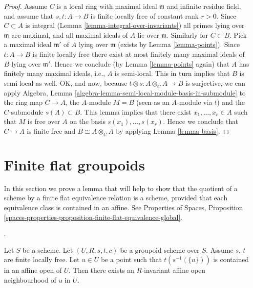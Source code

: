 \begin{proof}
\medskip\noindent
Assume $C$ is a local ring with maximal ideal $\mathfrak m$ and
infinite residue field, and assume that $s, t : A \to B$ is
finite locally free of constant rank $r > 0$.
Since $C \subset A$ is integral (Lemma \ref{lemma-integral-over-invariants})
all primes lying over $\mathfrak m$ are maximal, and all maximal
ideals of $A$ lie over $\mathfrak m$. Similarly for $C \subset B$.
Pick a maximal ideal $\mathfrak m'$
of $A$ lying over $\mathfrak m$ (exists by Lemma \ref{lemma-points}).
Since $t : A \to B$ is finite locally free there exist at most finitely
many maximal ideals of $B$ lying over $\mathfrak m'$. Hence we conclude
(by Lemma \ref{lemma-points} again)
that $A$ has finitely many maximal ideals, i.e.,
$A$ is semi-local. This in turn implies that $B$ is semi-local as
well. OK, and now, because $t \otimes s : A \otimes_C A \to B$ is surjective,
we can apply
Algebra, Lemma \ref{algebra-lemma-semi-local-module-basis-in-submodule}
to the ring map $C \to A$, the $A$-module $M = B$ (seen as an $A$-module
via $t$) and the $C$-submodule $s(A) \subset B$. This lemma implies that there
exist $x_1, \ldots, x_r \in A$ such that $M$ is free over $A$
on the basis $s(x_1), \ldots, s(x_r)$. Hence we conclude that $C \to A$
is finite free and $B \cong A \otimes_C A$ by applying
Lemma \ref{lemma-basis}.
\end{proof}



\section{Finite flat groupoids}
\label{section-finite-flat-general}

\noindent
In this section we prove a lemma that will help to show that the quotient
of a scheme by a finite flat equivalence relation is a scheme, provided that
each equivalence class is contained in an affine. See
Properties of Spaces,
Proposition \ref{spaces-properties-proposition-finite-flat-equivalence-global}.

\begin{lemma}
\label{lemma-find-invariant-affine}
\begin{reference}
\cite[Expos\'e 212, proof of Th\'eor\`eme 5.3, pp. 111--112]{FGA}.
\end{reference}
Let $S$ be a scheme.
Let $(U, R, s, t, c)$ be a groupoid scheme over $S$.
Assume $s$, $t$ are finite locally free.
Let $u \in U$ be a point such that $t(s^{-1}(\{u\}))$
is contained in an affine open of $U$.
Then there exists an $R$-invariant affine open neighbourhood
of $u$ in $U$.
\end{lemma}


